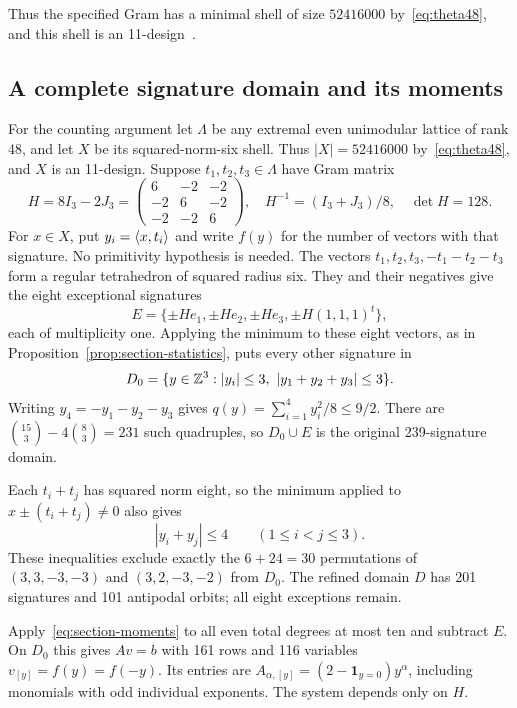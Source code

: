 Thus the specified Gram has a minimal shell of size $52416000$
by~\eqref{eq:theta48}, and this shell is an 11-design~\cite{nebe-designs}.

\subsection{A complete signature domain and its moments}
For the counting argument let $\Lambda$ be any extremal even unimodular
lattice of rank 48, and let $X$ be its squared-norm-six shell. Thus
$|X|=52416000$ by~\eqref{eq:theta48}, and $X$ is an 11-design.
Suppose $t_1,t_2,t_3\in\Lambda$ have Gram matrix
\begin{equation}\label{eq:45gram}
H=8I_3-2J_3
=\begin{pmatrix}6&-2&-2\\-2&6&-2\\-2&-2&6\end{pmatrix},
\quad H^{-1}=(I_3+J_3)/8,\quad\det H=128.
\end{equation}
For $x\in X$, put $y_i=\langle x,t_i\rangle$ and write $f(y)$ for the
number of vectors with that signature. No primitivity hypothesis is
needed. The vectors $t_1,t_2,t_3,-t_1-t_2-t_3$ form a regular
tetrahedron of squared radius six. They and their negatives give the
eight exceptional signatures
\[
E=\{\pm He_1,\pm He_2,\pm He_3,\pm H(1,1,1)^t\},
\]
each of multiplicity one. Applying the minimum to these eight vectors,
as in Proposition~\ref{prop:section-statistics}, puts every other
signature in
\[
D_0=\{y\in\Z^3:|y_i|\le3,\ |y_1+y_2+y_3|\le3\}.
\]
Writing $y_4=-y_1-y_2-y_3$ gives $q(y)=\sum_{i=1}^4y_i^2/8\le9/2$.
There are $\binom{15}{3}-4\binom{8}{3}=231$ such quadruples, so
$D_0\cup E$ is the original 239-signature domain.

Each $t_i+t_j$ has squared norm eight, so the minimum applied to
$x\pm(t_i+t_j)\ne0$ also gives
\begin{equation}\label{eq:45longer-anchors}
|y_i+y_j|\le4\qquad(1\le i<j\le3).
\end{equation}
These inequalities exclude exactly the $6+24=30$ permutations of
$(3,3,-3,-3)$ and $(3,2,-3,-2)$ from $D_0$. The refined domain $D$
has 201 signatures and 101 antipodal orbits; all eight exceptions remain.

Apply~\eqref{eq:section-moments} to all even total degrees at most ten
and subtract $E$. On $D_0$ this gives $Av=b$ with 161 rows and 116
variables $v_{[y]}=f(y)=f(-y)$. Its entries are
$A_{\alpha,[y]}=(2-\mathbf1_{y=0})y^\alpha$, including monomials
with odd individual exponents. The system depends only on $H$.


